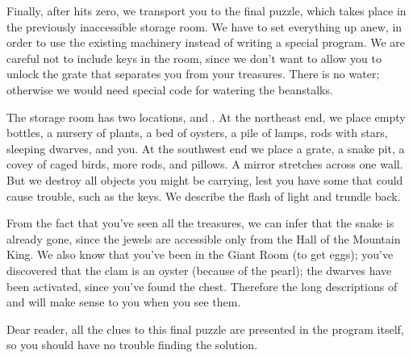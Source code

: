 Finally, after  hits zero, we transport
you to the final puzzle,
which takes place in the previously inaccessible storage room. We have to
set everything up anew, in order to use the existing machinery instead
of writing a special program. We are careful not to include keys
in the room, since we don't want to allow you to unlock the grate that
separates you from your treasures. There is no water; otherwise we
would need special code for watering the beanstalks.

The storage room has two locations,  and . At the
northeast
end, we place empty bottles, a nursery of plants, a bed of oysters, a pile
of lamps, rods with stars, sleeping dwarves, and you. At the southwest end
we place a grate, a snake pit, a covey of caged birds, more rods, and
pillows. A mirror stretches across one wall. But we destroy all objects
you might be carrying, lest you have some that could cause trouble,
such as the keys.  We describe the flash of light and trundle back.

From the fact that you've seen all the treasures, we can infer that
the snake is already gone, since the jewels are accessible only from
the Hall of the Mountain King. We also know that you've been in the
Giant Room (to get eggs); you've discovered that the clam is
an oyster (because of the pearl); the dwarves have been activated,
since you've found the chest. Therefore the long descriptions of
 and  will make sense to you when you see them.

Dear reader, all the clues to this final puzzle are presented in the
program itself, so you should have no trouble finding the solution.

